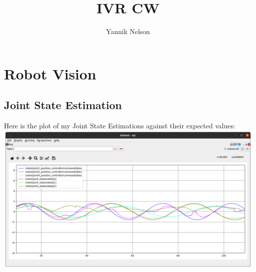 \documentclass[12pt]{article}
\title{IVR CW}
\author{Yannik Nelson}
\begin{document}
\maketitle
\tableofcontents \newpage

\section{Robot Vision}
\subsection{Joint State Estimation}
Here is the plot of my Joint State Estimations against their expected values:\newline
\includegraphics[width=\textwidth]{Joint_tracking_plus_one.png}
\end{document}
